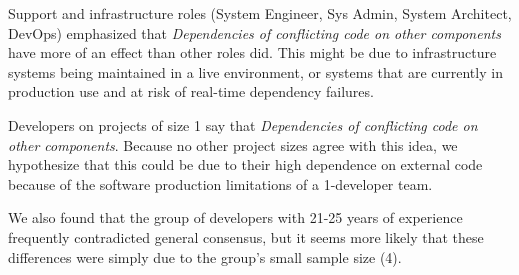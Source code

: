 
Support and infrastructure roles (System Engineer, Sys Admin, System Architect, DevOps) emphasized that \textit{Dependencies of conflicting code on other components} have more of an effect than other roles did. This might be due to infrastructure systems being maintained in a live environment, or systems that are currently in production use and at risk of real-time dependency failures. 

Developers on projects of size 1 say that \textit{Dependencies of conflicting code on other components}. Because no other project sizes agree with this idea, we hypothesize that this could be due to their high dependence on external code because of the software production limitations of a 1-developer team.

We also found that the group of developers with 21-25 years of experience frequently contradicted general consensus, but it seems more likely that these differences were simply due to the group's small sample size (4).

